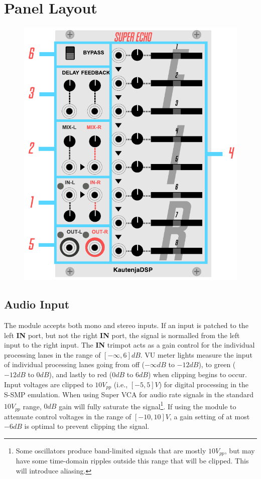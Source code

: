 \documentclass[12pt,letter]{article}
\begin{document}

\clearpage
\section{Panel Layout}

\begin{figure}[!htp]
\centering
\includegraphics{img/Interface}
\end{figure}

\subsection{Audio Input}

The module accepts both mono and stereo inputs. If an input is patched to the left \textbf{IN} port, but not the right \textbf{IN} port, the signal is normalled from the left input to the right input. The \textbf{IN} trimpot acts as a gain control for the individual processing lanes in the range of $[-\infty, 6]dB$. VU meter lights measure the input of individual processing lanes going from off ($-\infty dB$ to $-12dB$), to green ($-12dB$ to $0dB$), and lastly to red ($0dB$ to $6dB$) when clipping begins to occur. Input voltages are clipped to $10V_{pp}$ (i.e., $[-5, 5]V$) for digital processing in the S-SMP emulation. When using Super VCA for audio rate signals in the standard $10V_{pp}$ range, $0dB$ gain will fully saturate the signal\footnote{Some oscillators produce band-limited signals that are mostly $10V_{pp}$, but may have some time-domain ripples outside this range that will be clipped. This will introduce aliasing.}. If using the module to attenuate control voltages in the range of $[-10, 10]V$, a gain setting of at most $-6dB$ is optimal to prevent clipping the signal.
\end{document}
